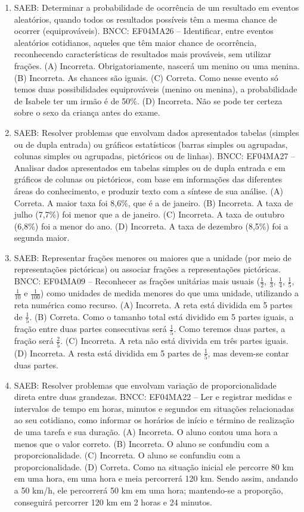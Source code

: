 \begin{enumerate}
\item
SAEB: Determinar a probabilidade de ocorrência de um
resultado em eventos aleatórios, quando todos os resultados possíveis
têm a mesma chance de ocorrer (equiprováveis).
BNCC: EF04MA26 -- Identificar, entre eventos aleatórios cotidianos, aqueles que têm maior chance de
ocorrência, reconhecendo características de resultados mais prováveis, sem utilizar frações.
(A) Incorreta. Obrigatoriamente, nascerá um menino ou uma menina.
(B) Incorreta. As chances são iguais.
(C) Correta. Como nesse evento só temos duas possibilidades equiprováveis (menino ou
menina), a probabilidade de Isabele ter um irmão é de 50\%.
(D) Incorreta. Não se pode ter certeza sobre o sexo da criança antes do exame.

\item
SAEB: Resolver problemas que envolvam dados apresentados
tabelas (simples ou de dupla entrada) ou gráficos estatísticos (barras
simples ou agrupadas, colunas simples ou agrupadas, pictóricos ou de
linhas).
BNCC: EF04MA27 -- Analisar dados apresentados em tabelas simples ou de dupla entrada e em gráficos de
colunas ou pictóricos, com base em informações das diferentes áreas do conhecimento, e produzir
texto com a síntese de sua análise.
(A) Correta. A maior taxa foi 8,6\%, que é a de janeiro.
(B) Incorreta. A taxa de julho (7,7\%) foi menor que a de janeiro.
(C) Incorreta. A taxa de outubro (6,8\%) foi a menor do ano.
(D) Incorreta. A taxa de dezembro (8,5\%) foi a segunda maior.

\item
SAEB: Representar frações menores ou maiores que a unidade
(por meio de representações pictóricas) ou associar frações a
representações pictóricas.
BNCC: EF04MA09 -- Reconhecer as frações unitárias mais usuais ($\frac{1}{2}$, $\frac{1}{3}$, $\frac{1}{4}$, $\frac{1}{5}$, $\frac{1}{10}$ e $\frac{1}{100}$) como
unidades de medida menores do que uma unidade, utilizando a reta numérica como recurso.
(A) Incorreta. A reta está dividida em 5 partes de $\frac{1}{5}$.
(B) Correta. Como o tamanho total está dividido em 5 partes iguais, a fração entre
duas partes consecutivas será $\frac{1}{5}$. Como teremos duas partes, a fração
será $\frac{2}{5}$.
(C) Incorreta. A reta não está divivida em três partes iguais.
(D) Incorreta. A resta está dividida em 5 partes de $\frac{1}{5}$, mas devem-se contar duas partes.

\item
SAEB: Resolver problemas que envolvam variação de
proporcionalidade direta entre duas grandezas.
BNCC: EF04MA22 -- Ler e registrar medidas e intervalos de tempo em horas, minutos e segundos em
situações relacionadas ao seu cotidiano, como informar os horários de início e término de realização
de uma tarefa e sua duração.
(A) Incorreta. O aluno contou uma hora a menos que o valor correto.
(B) Incorreta. O aluno se confundiu com a proporcionalidade.
(C) Incorreta. O aluno se confundiu com a proporcionalidade.
(D) Correta. Como na situação inicial ele percorre 80 km em uma hora, em uma hora e
meia percorrerá 120 km. Sendo assim, andando a 50 km/h, ele percorrerá 50 km em uma hora;
mantendo-se a proporção, conseguirá percorrer 120 km em 2 horas e 24
minutos.


\end{enumerate}
